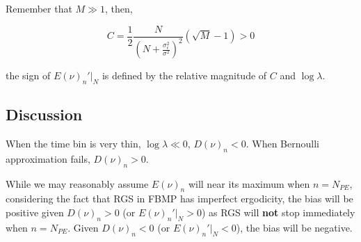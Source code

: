Remember that $M \gg 1$, then,

\begin{equation}
    C = \frac{1}{2}\frac{N}{(N+\frac{\sigma_\epsilon^2}{\sigma^2})^2}(\sqrt{M}-1) > 0
\end{equation}

the sign of $E(\nu)_n'|_N$ is defined by the relative magnitude of $C$ and $\log\lambda$. 

\subsection{Discussion}

When the time bin is very thin, $\log\lambda \ll 0$, $D(\nu)_n < 0$. When Bernoulli approximation fails, $D(\nu)_n > 0$. 

While we may reasonably assume $E(\nu)_n$ will near its maximum when $n=N_{PE}$, considering the fact that RGS in FBMP has imperfect ergodicity, the bias will be positive given $D(\nu)_n > 0$ (or $E(\nu)_n'|_N > 0$) as RGS will \textbf{not} stop immediately when $n=N_{PE}$. Given $D(\nu)_n < 0$ (or $E(\nu)_n'|_N < 0$), the bias will be negative. 
